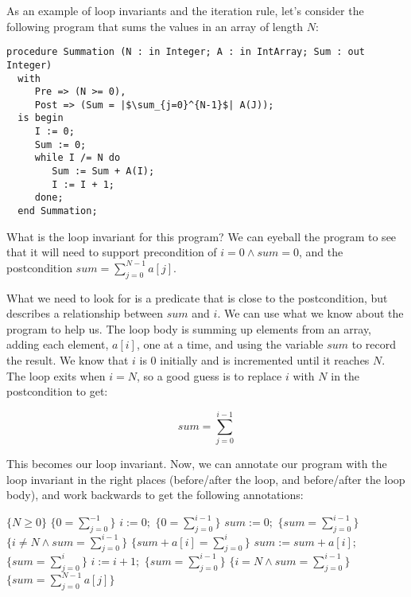 \begin{example}
As an example of loop invariants and the iteration rule, let's consider the following program that sums the values in an array of length $N$:

\lstset{aboveskip=3mm}
\begin{lstlisting}[escapeinside={||}]
  procedure Summation (N : in Integer; A : in IntArray; Sum : out Integer)
  with
     Pre => (N >= 0),
     Post => (Sum = |$\sum_{j=0}^{N-1}$| A(J));
  is begin
     I := 0;
     Sum := 0;
     while I /= N do
        Sum := Sum + A(I);
        I := I + 1;
     done;
  end Summation;
\end{lstlisting}



What is the loop invariant for this program? We can eyeball the program to see that it will need to support precondition of $i = 0 \land sum = 0$, and the postcondition $sum = \sum_{j=0}^{N - 1} a[j]$.

What we need to look for is a predicate that is close to the postcondition, but describes a relationship between $sum$ and $i$. We can use what we know about the program to help us. The loop body is summing up elements from an array, adding each element, $a[i]$, one at a time, and using the variable $sum$ to record the result. We know that $i$ is 0 initially and is incremented until it reaches $N$. The loop exits when $i = N$, so a good guess is to replace $i$ with $N$ in the postcondition to get:

\begin{displaymath}
 sum = \sum_{j=0}^{i - 1}
\end{displaymath}

This becomes our loop invariant. Now, we can annotate our program with the loop invariant in the right places (before/after the loop, and before/after the loop body), and work backwards to get the following annotations:

\begin{algorithmic}[0]
 \State $\{N \geq 0\}$
 \State $\{0 = \sum_{j=0}^{-1}\}$
 \State $i := 0;$
 \State $\{0 = \sum_{j=0}^{i - 1}\}$
 \State $sum := 0;$
 \State $\{sum = \sum_{j=0}^{i - 1}\}$
    \State $\{i \neq N \land sum = \sum_{j=0}^{i - 1}\}$
    \State $\{sum + a[i] = \sum_{j=0}^{i}\}$
    \State $sum := sum + a[i];$
    \State $\{sum = \sum_{j=0}^{i}\}$
    \State $i := i + 1;$
    \State $\{sum = \sum_{j=0}^{i - 1}\}$
 \EndWhile
 \State $\{i = N \land sum = \sum_{j=0}^{i - 1}\}$
 \State $\{sum = \sum_{j=0}^{N - 1} a[j]\}$
\end{algorithmic}


\end{example}
